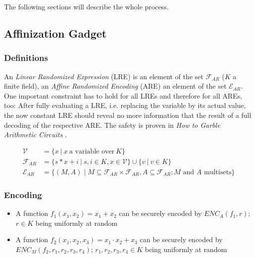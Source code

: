 \documentclass[12pt, a4paper]{article}
\begin{document}
The following sections will describe the whole process.


\subsection{Affinization Gadget}
\label{sec:affinization-gadget}

\subsubsection{Definitions}
\label{sec:affinization_definitions}

An \emph{Linear Randomized Expression} (LRE) is an element of the set
$\mathcal{F}_{AR}$ ($K$ a finite field), an \emph{Affine Randomized Encoding}
(ARE) an element of the set $\mathcal{E}_{AR}$. One important constraint has to
hold for all LREs and therefore for all AREs, too: After fully evaluating a LRE,
i.e. replacing the variable by its actual value, the now constant LRE should
reveal no more information that the result of a full decoding of the respective
ARE. The safety is proven in \emph{How to Garble Arithmetic Circuits}
\cite{gac2012}.

\begin{align}
\mathcal{V} & = \{ x\ |\ x\ \text{a variable over}\ K \} \\
\mathcal{F}_{AR} & = \{ s * x + i\ |\ s, i \in K, x \in \mathcal{V} \} \cup
\{ v\ |\ v \in K \} \\
\mathcal{E}_{AR} & = \{ (M, A) \mid M \subseteq \mathcal{F}_{AR} \times
\mathcal{F}_{AR}, A \subseteq \mathcal{F}_{AR}; \text{$M$ and $A$ multisets} \}
\end{align}


\subsubsection{Encoding}
\label{sec:affinization_encoding}

\begin{itemize}

\item A function $f_1(x_1, x_2) = x_1 + x_2$ can be securely encoded by
$ENC_A(f_1, r)$; $r \in K$ being uniformly at random

\item A function $f_2(x_1, x_2, x_3) = x_1 \cdot x_2 + x_3$ can be securely
encoded by $ENC_M(f_2, r_1, r_2, r_3, r_4)$; $r_1, r_2, r_3, r_4 \in K$ being
uniformly at random
\end{itemize}
\end{document}
